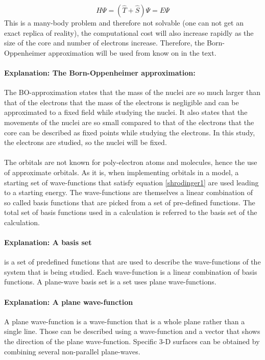 \documentclass[12pt,a4paper]{article}
\begin{document}
\begin{equation} \label{shrodinger1}
H \Psi = ( \hat{T} + \hat{S}) \Psi = E \Psi
\end{equation}
This is a many-body problem and therefore not solvable (one can not get an exact replica of reality), the computational cost will also increase rapidly as the size of the core and number of electrons increase. Therefore, the Born-Oppenheimer approximation will be used from know on in the text.

\paragraph{Explanation: The Born-Oppenheimer approximation:}
The BO-approximation states that the mass of the nuclei are so much larger than that of the electrons that the mass of the electrons is negligible and can be approximated to a fixed field while studying the nuclei. It also states that the movements of the nuclei are so small compared to that of the electrons that the core can be described as fixed points while studying the electrons. In this study, the electrons are studied, so the nuclei will be fixed. 

\paragraph*{}
 The orbitals are not known for poly-electron atoms and molecules, hence the use of approximate orbitals. As it is, when implementing orbitals in a model,  a starting set of wave-functions that satisfy equation \ref{shrodinger1} are used leading to a starting energy. The wave-functions are themselves a linear combination of so called basis functions that are picked from a set of pre-defined functions. The total set of basis functions used in a calculation is referred to the basis set of the calculation. 

\paragraph{Explanation: A basis set} is a set of predefined functions that are used to describe the wave-functions of the system that is being studied. Each wave-function is a linear combination of basis functions. \cite{burke} A plane-wave basis set is a set uses plane wave-functions.

\paragraph{Explanation: A plane wave-function}
A plane wave-function  is a wave-function that is a whole plane rather than a single line. Those can be described using a wave-function and a vector that shows the direction of the plane wave-function. Specific 3-D surfaces can be obtained by combining several non-parallel plane-waves. 
\end{document}
